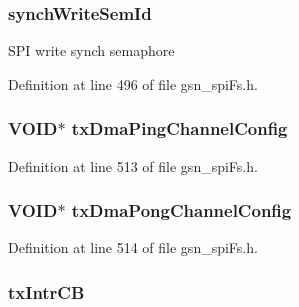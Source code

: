 \hypertarget{a00232_ae01fab2e8492394ab72da071913c49fd}{
\subsubsection[{synchWriteSemId}]{ {\bf synchWriteSemId}}}
\label{a00232_ae01fab2e8492394ab72da071913c49fd}
SPI write synch semaphore 

Definition at line 496 of file gsn\_\-spiFs.h.

\hypertarget{a00232_aa0e5ef8888315014132a72402c5c8ba6}{
\subsubsection[{txDmaPingChannelConfig}]{\setlength{\rightskip}{0pt plus 5cm}VOID$\ast$ {\bf txDmaPingChannelConfig}}}
\label{a00232_aa0e5ef8888315014132a72402c5c8ba6}


Definition at line 513 of file gsn\_\-spiFs.h.

\hypertarget{a00232_a547f76d857761154a931bf0fd0f0a4ee}{
\subsubsection[{txDmaPongChannelConfig}]{\setlength{\rightskip}{0pt plus 5cm}VOID$\ast$ {\bf txDmaPongChannelConfig}}}
\label{a00232_a547f76d857761154a931bf0fd0f0a4ee}


Definition at line 514 of file gsn\_\-spiFs.h.

\hypertarget{a00232_a6325a4c01ac28ef24556da869462013f}{
\subsubsection[{txIntrCB}]{ {\bf txIntrCB}}}
\label{a00232_a6325a4c01ac28ef24556da869462013f}


